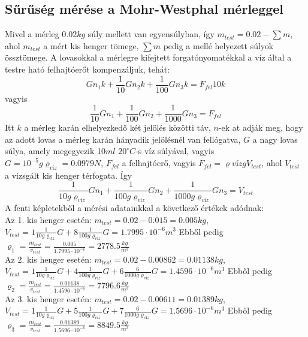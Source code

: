 \documentclass[10pt,pdftex]{report}
\begin{document}
\subsection*{Sűrűség mérése a Mohr-Westphal mérleggel}
Mivel a mérleg 0.02$kg$ súly mellett van egyensúlyban, így $m_{test}=0.02-\sum m$,  ahol $m_{test}$ a mért kis henger tömege, $\sum m $ pedig a mellé helyezett súlyok össztömege. A lovasokkal a mérlegre kifejtett forgatónyomatékkal a víz által a testre ható felhajtóerőt kompenzáljuk, tehát:
\begin{equation*}
    Gn_1k+\frac{1}{10}Gn_2k+\frac{1}{100}Gn_3k=F_{fel}10k
\end{equation*}
vagyis
\begin{equation*}
    \frac{1}{10}Gn_1+\frac{1}{100}Gn_2+\frac{1}{1000}Gn_3=F_{fel}
\end{equation*}
Itt $k$ a mérleg karán elhelyezkedő két jelölés közötti táv, $n$-ek at adják meg, hogy az adott lovas a mérleg karán hányadik jelölésnél van fellógatva, $G$ a nagy lovas súlya, amely megegyezik 10$ml$ $20^\circ C$-s víz súlyával, vagyis $G=10^{-5}g\varrho_{víz}=0.0979N$, $F_{fel}$ a felhajtóerő, vagyis $F_{fel}=\varrho{víz}gV_{test}$, ahol $V_{test}$ a vizsgált kis henger térfogata. Így 
\begin{equation*}
    \frac{1}{10g\varrho_{víz}}Gn_1+\frac{1}{100g\varrho_{víz}}Gn_2+\frac{1}{1000g\varrho_{víz}}Gn_3=V_{test}
\end{equation*}
A fenti képletekből a mérési adatainkkal a következő értékek adódnak:\\


Az 1. kis henger esetén: $m_{test}= 0.02-0.015=0.005kg$, $V_{test}=1\frac{1}{10g\varrho_{víz}}G+8\frac{1}{100g\varrho_{víz}}G=1.7995\cdot10^{-6}m^3$ Ebből pedig $\varrho_1=\frac{m_{test}}{v_{test}}=\frac{0.005}{1.7995\cdot10^{-6}}=2778.5\frac{kg}{m^3}$\\



Az 2. kis henger esetén: $m_{test}= 0.02-0.00862=0.01138kg$, $V_{test}=1\frac{1}{10g\varrho_{víz}}G+4\frac{1}{100g\varrho_{víz}}G+6\frac{6}{1000g\varrho_{víz}}G=1.4596\cdot10^{-6}m^3$ Ebből pedig $\varrho_2=\frac{m_{test}}{v_{test}}=\frac{0.01138}{1.4596\cdot10^{-6}}=7796.6\frac{kg}{m^3}$\\


Az 3. kis henger esetén: $m_{test}= 0.02-0.00611=0.01389kg$, $V_{test}=1\frac{1}{10g\varrho_{víz}}G+5\frac{1}{100g\varrho_{víz}}G+7\frac{6}{1000g\varrho_{víz}}G=1.5696\cdot10^{-6}m^3$ Ebből pedig $\varrho_3=\frac{m_{test}}{v_{test}}=\frac{0.01389}{1.5696\cdot10^{-6}}=8849.5\frac{kg}{m^3}$
\end{document}
